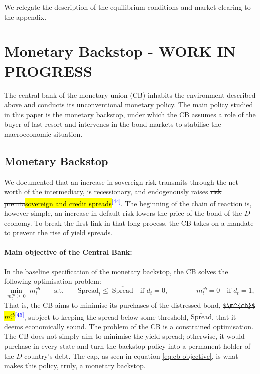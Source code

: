 \documentclass[11pt]{article}
\newcommand{\A}[1]{\hl{#1}}
\newcommand{\D}[1]{{\color{red}\st{#1}}}
\newcommand{\chg}[1]{\textsuperscript{\textcolor{blue}{\scriptsize[#1]}}}
\begin{document}
We relegate the description of the equilibrium conditions and market clearing to the appendix.

\setcounter{section}{3}
\section{Monetary Backstop - WORK IN PROGRESS}
\label{sec:policy}

The central bank of the monetary union (CB) inhabits the environment described above and conducts its unconventional monetary policy. The main policy studied in this paper is the monetary backstop, under which the CB assumes a role of the buyer of last resort and intervenes in the bond markets to stabilise the macroeconomic situation.

\subsection{Monetary Backstop}
We documented that an increase in sovereign risk transmits through the net worth of the intermediary, is recessionary, and endogenously raises \D{risk premia}\A{sovereign and credit spreads}\chg{44}. The beginning of the chain of reaction is, however simple, an increase in default risk lowers the price of the bond of the $D$ economy. To break the first link in that long process, the CB takes on a mandate to prevent the rise of yield spreads.

\paragraph{Main objective of the Central Bank:} In the baseline specification of the monetary backstop, the CB solves the following optimisation problem:
\begin{equation}
\min_{m^{cb}_t\,\ge\,0}\;m^{cb}_t
\qquad\text{s.t.}\qquad
\text{Spread}_t\le\;\overline{\text{Spread}}
\quad\text{if } d_t=0,
\qquad\qquad
m^{cb}_t=0\quad\text{if } d_t=1,
\label{eq:cb-objective}
\end{equation}
That is, the CB aims to minimise its purchases of the distressed bond, \D{\texttt{\$\textbackslash m\^{}\{cb\}\$}}\A{$m^{cb}_t$}\chg{45}, subject to keeping the spread below some threshold, $\overline{\text{Spread}}$, that it deems economically sound. The problem of the CB is a constrained optimisation. The CB does not simply aim to minimise the yield spread; otherwise, it would purchase in every state and turn the backstop policy into a permanent holder of the $D$ country's debt. The cap, as seen in equation \ref{eq:cb-objective}, is what makes this policy, truly, a monetary backstop.
\end{document}
